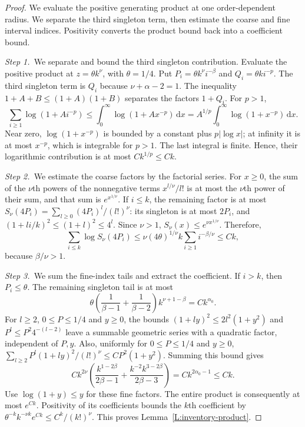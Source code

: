 \documentclass[12pt,oneside,openany]{book}
\numberwithin{equation}{section}
\theoremstyle{nogostyle}
\theoremstyle{definition}
\newcommand{\ud}{\,\mathrm{d}}
\begin{document}
\begin{proof}
  We evaluate the positive generating product at one order-dependent radius.
  We separate the third singleton term, then estimate the coarse and fine
  interval indices. Positivity converts the product bound back into a
  coefficient bound.


  \medskip
  \noindent\textit{Step 1.~}We separate and bound the third singleton
  contribution.
  Evaluate the positive product at $z = \theta k^\nu$, with $\theta = 1/4$. Put
  $P_i = \theta k^\nu i^{-\beta}$ and $Q_i = \theta k i^{-p}$. The third
  singleton term is $Q_i$ because $\nu+\alpha-2 = 1$. The inequality $1+A+B \le
  (1+A)(1+B)$ separates the factors $1+Q_i$. For $p > 1$,
  \[
    \sum_{i\ge1}\log(1+A i^{-p})
    \le\int_0^\infty\log(1+A x^{-p})\ud x
    =A^{1/p}\int_0^\infty\log(1+x^{-p})\ud x.
  \]
  Near zero, $\log(1+x^{-p})$ is bounded by a constant plus $p|\log x|$; at
  infinity it is at most $x^{-p}$, which is integrable for $p>1$.
  The last integral is finite. Hence, their logarithmic contribution is at most
  $Ck^{1/p} \le Ck$.


  \medskip
  \noindent\textit{Step 2.~}We estimate the coarse factors by the factorial
  series.
  For $x\ge0$, the sum of the $\nu$th powers of the nonnegative terms
  $x^{l/\nu}/l!$ is at most the $\nu$th power of their sum, and that sum is
  $e^{x^{1/\nu}}$.
  If $i \le k$, the remaining factor is at most $S_\nu(4P_i) =
  \sum_{l\ge0}(4P_i)^l/(l!)^\nu$: its singleton is at most $2P_i$, and
  $(1+li/k)^2 \le (1+l)^2 \le 4^l$. Since $\nu > 1$, $S_\nu(x) \le e^{\nu
  x^{1/\nu}}$. Therefore,
  \[
    \sum_{i\le k}\log S_\nu(4P_i)
    \le\nu(4\theta)^{1/\nu}k\sum_{i\ge1}i^{-\beta/\nu}
    \le Ck,
  \]
  because $\beta/\nu > 1$.



  \medskip
  \noindent\textit{Step 3.~}We sum the fine-index tails and extract the
  coefficient.
  If $i > k$, then $P_i \le \theta$. The remaining singleton tail is at most
  \[
    \theta\left(\frac1{\beta-1}+\frac1{\beta-2}\right)
    k^{\nu+1-\beta}=Ck^{\alpha_0}.
  \]
  For $l\ge2$, $0\le P\le1/4$ and $y\ge0$, the bounds $(1+ly)^2\le2l^2(1+y^2)$
  and $P^l\le P^2 4^{-(l-2)}$ leave a summable geometric series with a
  quadratic factor, independent of $P,y$.
  Also, uniformly for $0 \le P \le 1/4$ and $y \ge 0$,
  $\sum_{l\ge2}P^l(1+ly)^2/(l!)^\nu \le CP^2(1+y^2)$. Summing this bound gives
  \[
    Ck^{2\nu}\left(\frac{k^{1-2\beta}}{2\beta-1}
    +\frac{k^{-2}k^{3-2\beta}}{2\beta-3}\right)
    =Ck^{2\alpha_0-1}\le Ck.
  \]
  Use $\log(1+y) \le y$ for these fine factors. The entire product is
  consequently at most $e^{Ck}$. Positivity of its coefficients bounds the $k$th
  coefficient by $\theta^{-k}k^{-\nu k}e^{Ck} \le C^k/(k!)^\nu$. This proves
  Lemma~\ref{L:inventory-product}.
\end{proof}
\end{document}
